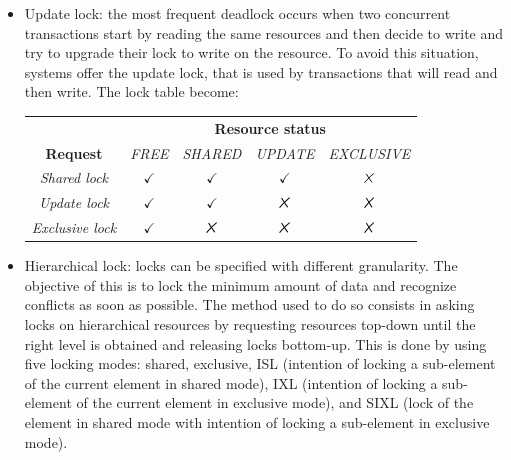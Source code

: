 \begin{itemize}
    \item Update lock: the most frequent deadlock occurs when two concurrent transactions start by reading the same resources and then decide to write and try to upgrade their lock to write on the resource. 
    To avoid this situation, systems offer the update lock, that is used by transactions that will read and then write. 
    The lock table become: 
    \begin{table}[H]
        \centering
        \begin{tabular}{ccccc}
        \textbf{}                                     & \multicolumn{4}{c}{\textbf{Resource status}}                                                                                                        \\ \cline{2-5} 
        \multicolumn{1}{c|}{\textbf{Request}}         & \textit{FREE}                     & \textit{SHARED}                   & \textit{UPDATE}                   & \multicolumn{1}{c|}{\textit{EXCLUSIVE}} \\ \hline
        \multicolumn{1}{|c|}{\textit{Shared lock}}    & \multicolumn{1}{c|}{$\checkmark$} & \multicolumn{1}{c|}{$\checkmark$} & \multicolumn{1}{c|}{$\checkmark$} & \multicolumn{1}{c|}{$\tikzxmark$}       \\ \hline
        \multicolumn{1}{|c|}{\textit{Update lock}}    & \multicolumn{1}{c|}{$\checkmark$} & \multicolumn{1}{c|}{$\checkmark$} & \multicolumn{1}{c|}{$\tikzxmark$} & \multicolumn{1}{c|}{$\tikzxmark$}       \\ \hline
        \multicolumn{1}{|c|}{\textit{Exclusive lock}} & \multicolumn{1}{c|}{$\checkmark$} & \multicolumn{1}{c|}{$\tikzxmark$} & \multicolumn{1}{c|}{$\tikzxmark$} & \multicolumn{1}{c|}{$\tikzxmark$}       \\ \hline
        \end{tabular}
    \end{table}
    \item Hierarchical lock: locks can be specified with different granularity. 
        The objective of this is to lock the minimum amount of data and recognize conflicts as soon as possible.
        The method used to do so consists in asking locks on hierarchical resources by requesting resources top-down until the right level is obtained and releasing locks bottom-up. 
        This is done by using five locking modes: shared, exclusive, ISL (intention of locking a sub-element of the current element in shared mode), IXL (intention of locking a sub-element of the current element in exclusive mode), and SIXL (lock of the element in shared mode with intention of locking a sub-element in exclusive mode). 

\end{itemize}
